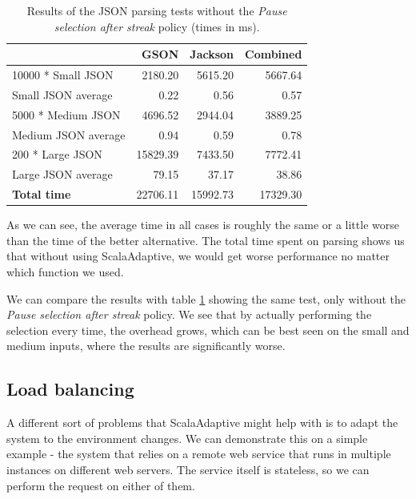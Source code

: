\begin{table}[h!]
	\captionsetup{justification=centering,margin=0.5cm}
	\bgroup
	\def\arraystretch{1.5}%
	\begin{center}
		\begin{tabular}{ | l | r | r | r | }
			\hline
			& \textbf{GSON} & \textbf{Jackson} & \textbf{Combined} \\ \hline
			10000 * Small JSON  & 2180.20       & 5615.20          & 5667.64           \\ \hline
			Small JSON average  & 0.22          & 0.56             & 0.57              \\ \hline
			5000 * Medium JSON  & 4696.52       & 2944.04          & 3889.25           \\ \hline
			Medium JSON average & 0.94          & 0.59             & 0.78              \\ \hline
			200 * Large JSON    & 15829.39      & 7433.50          & 7772.41           \\ \hline
			Large JSON average  & 79.15         & 37.17            & 38.86             \\ \hline
			\textbf{Total time}          & 22706.11      & 15992.73         & 17329.30          \\ \hline
		\end{tabular}
	\end{center}
	\egroup
	\caption{Results of the JSON parsing tests without the \textit{Pause selection after streak} policy (times in ms).}
	\label{tab:json_parsing_results_no_policy}
\end{table}

As we can see, the average time in all cases is roughly the same or a little worse than the time of the better alternative. The total time spent on parsing shows us that without using ScalaAdaptive, we would get worse performance no matter which function we used.

We can compare the results with table \ref{tab:json_parsing_results_no_policy} showing the same test, only without the \textit{Pause selection after streak} policy. We see that by actually performing the selection every time, the overhead grows, which can be best seen on the small and medium inputs, where the results are significantly worse.


\subsection{Load balancing}

A different sort of problems that ScalaAdaptive might help with is to adapt the system to the environment changes. We can demonstrate this on a simple example - the system that relies on a remote web service that runs in multiple instances on different web servers. The service itself is stateless, so we can perform the request on either of them. 

